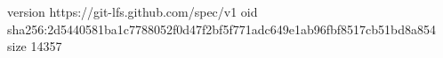version https://git-lfs.github.com/spec/v1
oid sha256:2d5440581ba1c7788052f0d47f2bf5f771adc649e1ab96fbf8517cb51bd8a854
size 14357
